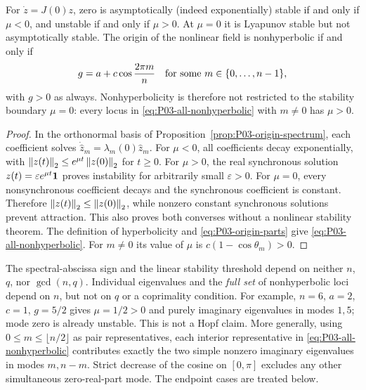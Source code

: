 \begin{proposition}
\label{prop:P03-stability}
For $\dot z=J(0)z$, zero is asymptotically (indeed exponentially)
stable if and only if $\mu<0$, and unstable if and only if $\mu>0$.
At $\mu=0$ it is Lyapunov stable but not asymptotically stable.
The origin of the nonlinear field is nonhyperbolic if and only if
\begin{equation}
 g=a+c\cos\frac{2\pi m}{n}
 \quad\hbox{for some }m\in\{0,\ldots,n-1\},
 \label{eq:P03-all-nonhyperbolic}
\end{equation}
with $g>0$ as always. Nonhyperbolicity is therefore not restricted
to the stability boundary $\mu=0$: every locus in
\eqref{eq:P03-all-nonhyperbolic} with $m\ne0$ has $\mu>0$.
\end{proposition}
\begin{proof}
In the orthonormal basis of Proposition~\ref{prop:P03-origin-spectrum},
each coefficient solves $\dot{\widehat z}_m=\lambda_m(0)\widehat z_m$.
For $\mu<0$, all coefficients decay exponentially, with
$\left\lVert z(t)\right\rVert_2\le e^{\mu t}\left\lVert z(0)\right\rVert_2$ for $t\ge0$.
For $\mu>0$, the real synchronous solution
$z(t)=\varepsilon e^{\mu t}\mathbf{1}$ proves instability for arbitrarily
small $\varepsilon>0$. For $\mu=0$, every nonsynchronous coefficient
 decays and the synchronous coefficient is constant. Therefore
$\left\lVert z(t)\right\rVert_2\le\left\lVert z(0)\right\rVert_2$, while nonzero constant synchronous
solutions prevent attraction. This also proves both converses
without a nonlinear stability theorem. The definition of hyperbolicity
and \eqref{eq:P03-origin-parts} give
\eqref{eq:P03-all-nonhyperbolic}. For $m\ne0$ its value of
$\mu$ is $c(1-\cos\theta_m)>0$.
\end{proof}

The spectral-abscissa sign and the linear stability threshold depend
on neither $n$, $q$, nor $\gcd(n,q)$. Individual eigenvalues and the
\emph{full set} of nonhyperbolic loci depend on $n$, but not on $q$
or a coprimality condition. For example, $n=6$, $a=2$, $c=1$,
$g=5/2$ gives $\mu=1/2>0$ and purely imaginary eigenvalues in
modes $1,5$; mode zero is already unstable. This is not a Hopf claim.
More generally, using $0\le m\le\lfloor n/2\rfloor$ as pair
representatives, each interior representative in
\eqref{eq:P03-all-nonhyperbolic} contributes exactly the two
simple nonzero imaginary eigenvalues in modes $m,n-m$.
Strict decrease of the cosine on $[0,\pi]$ excludes any other
simultaneous zero-real-part mode. The endpoint cases are treated below.

